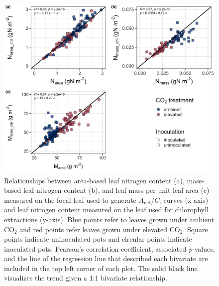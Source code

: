 \newpage
\begin{figure}
    \centering
    \includegraphics[width=\linewidth]{ch5_NxCO2xI/figs/NxCO2xI_figS1_leafN_chl_.png}
    \caption[Relationships between area-based leaf nitrogen content, mass-based leaf nitrogen content, and leaf mass per unit leaf area measured on the focal leaf used to generate $A_\mathrm{net}$/$C_\mathrm{i}$ curves and leaf nitrogen content measured on the leaf used for chlorophyll extractions]{Relationships between area-based leaf nitrogen content (a), mass-based leaf nitrogen content (b), and leaf mass per unit leaf area (c) measured on the focal leaf used to generate $A_\mathrm{net}$/$C_\mathrm{i}$ curves (x-axis) and leaf nitrogen content measured on the leaf used for chlorophyll extractions (y-axis). Blue points refer to leaves grown under ambient CO$_2$ and red points refer leaves grown under elevated CO$_2$. Square points indicate uninoculated pots and circular points indicate inoculated pots. Pearson's correlation coefficient, associated \textit{p}-values, and the line of the regression line that described each bivariate are included in the top left corner of each plot. The solid black line visualizes the trend given a 1:1 bivariate relationship.}
    \label{fig:figure.d1}
\end{figure}
\clearpage

